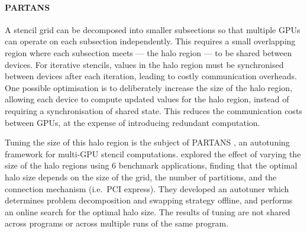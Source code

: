 \paragraph{PARTANS} A stencil grid can be decomposed into smaller
subsections so that multiple GPUs can operate on each subsection
independently. This requires a small overlapping region where each
subsection meets --- the halo region --- to be shared between
devices. For iterative stencils, values in the halo region must be
synchronised between devices after each iteration, leading to costly
communication overheads. One possible optimisation is to deliberately
increase the size of the halo region, allowing each device to compute
updated values for the halo region, instead of requiring a
synchronisation of shared state. This reduces the communication costs
between GPUs, at the expense of introducing redundant computation.

Tuning the size of this halo region is the subject of PARTANS
\cite{Lutz2013}, an autotuning framework for multi-GPU stencil
computations. \citeauthor{Lutz2013} explored the effect of varying the
size of the halo regions using 6 benchmark applications, finding that
the optimal halo size depends on the size of the grid, the number of
partitions, and the connection mechanism (i.e.\ PCI express). They
developed an autotuner which determines problem decomposition and
swapping strategy offline, and performs an online search for the
optimal halo size.  The results of
tuning are not shared across programs or across multiple runs of the
same program.

